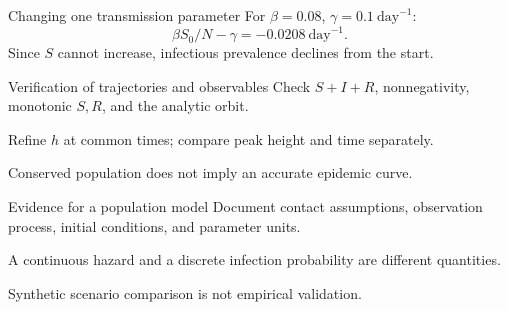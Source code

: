 \documentclass[aspectratio=169,11pt]{beamer}
\newcommand{\notestarget}{notes.pdf}\newcommand{\noteslabel}{Notes}
\begin{document}
\renewcommand{\notestarget}{notes.pdf\#note-numerical-evidence-and-model-discrepancy}
\begin{frame}[t,fragile,label=slide-changing-one-transmission-parameter]{Changing one transmission parameter}
For $\beta=0.08$, $\gamma=0.1\ \mathrm{day}^{-1}$:\[\beta S_0/N-\gamma=-0.0208\ \mathrm{day}^{-1}.\]\pause{} Since $S$ cannot increase, infectious prevalence declines from the start.
\end{frame}
\renewcommand{\notestarget}{notes.pdf\#note-numerical-evidence-and-model-discrepancy}
\begin{frame}[t,fragile,label=slide-verification-of-trajectories-and-observables]{Verification of trajectories and observables}
Check $S+I+R$, nonnegativity, monotonic $S,R$, and the analytic orbit.\pause{}\par\medskip Refine $h$ at common times; compare peak height and time separately.\par\medskip Conserved population does not imply an accurate epidemic curve.
\end{frame}
\renewcommand{\notestarget}{notes.pdf\#note-numerical-evidence-and-model-discrepancy}
\begin{frame}[t,fragile,label=slide-evidence-for-a-population-model]{Evidence for a population model}
Document contact assumptions, observation process, initial conditions, and parameter units.\pause{}\par\medskip A continuous hazard and a discrete infection probability are different quantities.\par\medskip Synthetic scenario comparison is not empirical validation.
\end{frame}
\end{document}
